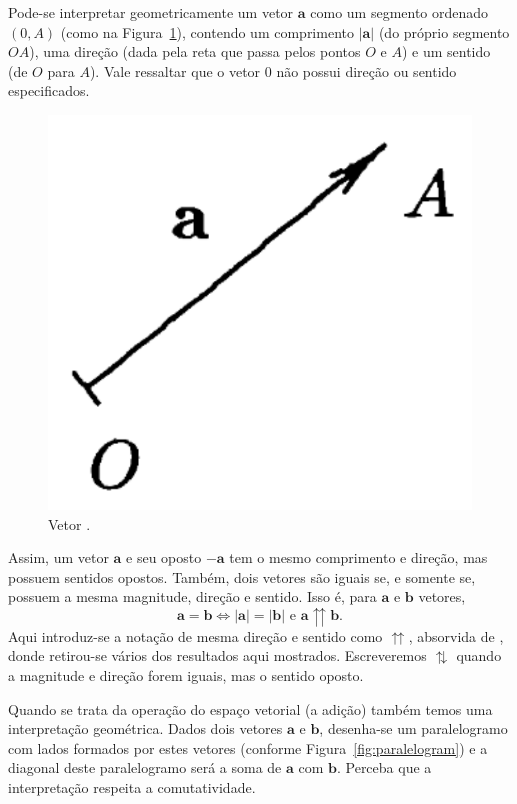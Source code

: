 \documentclass[a4paper,12pt]{report}
\theoremstyle{plain}
\theoremstyle{definition}
\newcommand{\norm}[1]{\left| #1 \right|}
\begin{document}
\hspace{-0.7cm}
\begin{minipage}{0.72\linewidth}
	\setlength\parindent{24pt} Pode-se interpretar geometricamente um vetor $\mathbf a$ como um segmento ordenado $(0,A)$ (como na Figura~\ref{fig:vector}), contendo um comprimento $\norm{\mathbf a}$ (do próprio segmento $OA$), uma direção (dada pela reta que passa pelos pontos $O$ e $A$) e um sentido (de $O$ para $A$). Vale ressaltar que o vetor $0$ não possui direção ou sentido especificados. 
\end{minipage}
\begin{minipage}{0.3\linewidth}
	\begin{figure}[H]
		\begin{center}
			\includegraphics[width=0.6\linewidth]{figures/vector.pdf}
		\end{center}
		\caption{Vetor\label{fig:vector} \cite{lounestoClifford}.}
	\end{figure}
\end{minipage}

Assim, um vetor $\mathbf a$ e seu oposto $-\mathbf a$ tem o mesmo comprimento e direção, mas possuem sentidos opostos. Também, dois vetores são iguais se, e somente se, possuem a mesma magnitude, direção e sentido. Isso é, para $\mathbf{a}$ e $\mathbf{b}$ vetores,
$$\mathbf a = \mathbf b \iff \norm{\mathbf{a}} = \norm{\mathbf{b}} \text{ e } \mathbf{a}\upuparrows\mathbf{b}.$$
Aqui introduz-se a notação de mesma direção e sentido como $\upuparrows$, absorvida de \cite{lounestoClifford}, donde retirou-se vários dos resultados aqui mostrados. Escreveremos $\updownarrows$ quando a magnitude e direção forem iguais, mas o sentido oposto.

Quando se trata da operação do espaço vetorial (a adição) também temos uma interpretação geométrica. Dados dois vetores $\mathbf a$ e $\mathbf b$, desenha-se um paralelogramo com lados formados por estes vetores (conforme Figura~\ref{fig:paralelogram}) e a diagonal deste paralelogramo será a soma de $\mathbf a$ com $\mathbf b$. Perceba que a interpretação respeita a comutatividade.
\end{document}
